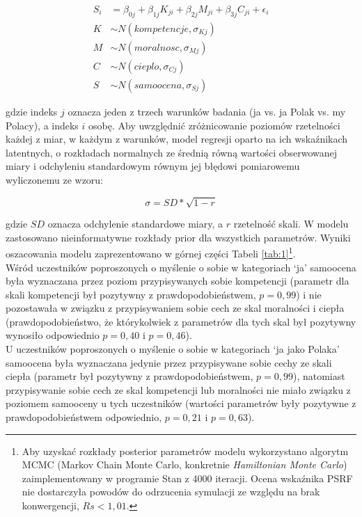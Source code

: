\documentclass[man]{apa6}
\begin{document}
\begin{equation}\label{eq:1}
\begin{split}
S_{i} & = \beta_{0j} + \beta_{1j}K_{ji} + \beta_{2j}M_{ji} + \beta_{3j}C_{ji} + \epsilon_{i} \\
K & \sim N(kompetencje, \sigma_{Kj}) \\
M & \sim N(moralnosc, \sigma_{Mj}) \\
C & \sim N(cieplo, \sigma_{Cj}) \\
S & \sim N(samoocena, \sigma_{Sj})
\end{split}
\end{equation}

gdzie indeks $j$ oznacza jeden z trzech warunków badania (ja vs. ja Polak vs. my Polacy), a indeks $i$ osobę. Aby uwzględnić zróżnicowanie poziomów rzetelności każdej z miar, w każdym z warunków, model regresji oparto na ich wskaźnikach latentnych, o rozkładach normalnych ze średnią równą wartości obserwowanej miary i odchyleniu standardowym równym jej błędowi pomiarowemu wyliczonemu ze wzoru:

\begin{equation}\label{eq:err}
\sigma = SD*\sqrt{1 - r}
\end{equation}

gdzie $SD$ oznacza odchylenie standardowe miary, a $r$ rzetelność skali. W modelu zastosowano nieinformatywne rozkłady prior dla wszystkich parametrów. Wyniki oszacowania modelu zaprezentowano w górnej części Tabeli \ref{tab:1}\footnote{Aby uzyskać rozkłady posterior parametrów modelu wykorzystano algorytm MCMC (Markov Chain Monte Carlo, konkretnie \emph{Hamiltonian Monte Carlo}) zaimplementowany w programie Stan \parencite{carpenter2016} z 4000 iteracji. Ocena wskaźnika PSRF nie dostarczyła powodów do odrzucenia symulacji ze względu na brak konwergencji, $Rs < 1,01$.}. \\

Wśród uczestników poproszonych o myślenie o sobie w kategoriach `ja' samoocena była wyznaczana przez poziom przypisywanych sobie kompetencji (parametr dla skali kompetencji był pozytywny z prawdopodobieństwem, $p = 0,99$) i nie pozostawała w związku z przypisywaniem sobie cech ze skal moralności i ciepła (prawdopodobieństwo, że którykolwiek z parametrów dla tych skal był pozytywny wynosiło odpowiednio $p = 0,40$ i $p = 0,46$). \\

U uczestników poproszonych o myślenie o sobie w kategoriach `ja jako Polaka' samoocena była wyznaczana jedynie przez przypisywane sobie cechy ze skali ciepła (parametr był pozytywny z prawdopodobieństwem, $p = 0,99$), natomiast przypisywanie sobie cech ze skal kompetencji lub moralności nie miało związku z poziomem samooceny u tych uczestników (wartości parametrów były pozytywne z prawdopodobieństwem odpowiednio, $p = 0,21$ i $p = 0,63$). \\
\end{document}
